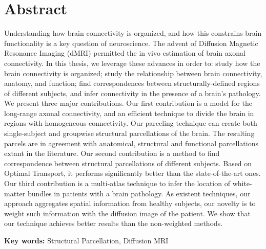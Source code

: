 \chapter{Abstract}
Understanding how brain connectivity is organized, and how
this constrains brain functionality is a key question of neuroscience. The advent
of Diffusion Magnetic Resonance Imaging (dMRI) permitted the in vivo estimation
of brain axonal connectivity. In this thesis, we leverage these advances in order
to: study how the brain connectivity is organized; study the relationship between
brain connectivity, anatomy, and function; find correspondences between 
structurally-defined regions of different subjects, and infer connectivity in
the presence of a brain’s pathology. We present three major contributions. Our
first contribution is a model for the long-range axonal connectivity, and an
efficient technique to divide the brain in regions with homogeneous connectivity.
Our parceling technique can create both single-subject and groupwise structural
parcellations of the brain. The resulting parcels are in agreement with anatomical,
structural and functional parcellations extant in the literature. Our second
contribution is a method to find correspondence between structural parcellations
of different subjects. Based on Optimal Transport, it performs significantly better
than the state-of-the-art ones. Our third contribution is a multi-atlas technique
to infer the location of white-matter bundles in patients with a brain pathology.
As existent techniques, our approach aggregates spatial information from healthy subjects,
our novelty is to weight such information with the diffusion image of the patient.
We show that our technique achieves better results than the non-weighted methods.

\vspace{1cm}

\textbf{Key words:} Structural Parcellation, Diffusion MRI
